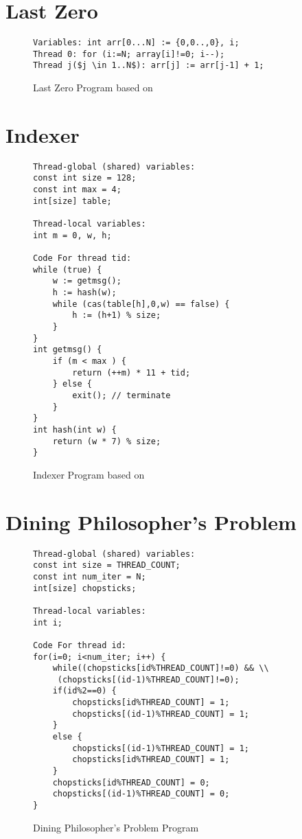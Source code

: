 \section{Last Zero}
\begin{figure}[h]
\begin{lstlisting}[mathescape=true,style=customc]
Variables: int arr[0...N] := {0,0..,0}, i;
Thread 0: for (i:=N; array[i]!=0; i--);
Thread j($j \in 1..N$): arr[j] := arr[j-1] + 1;
\end{lstlisting}
\caption{Last Zero Program based on \citet{abdulla2014optimal}}
\label{code_lastzero}
\end{figure}

\section{Indexer}
\begin{figure}[h]
\begin{lstlisting}[style=customc]
Thread-global (shared) variables:
const int size = 128;
const int max = 4;
int[size] table;

Thread-local variables:
int m = 0, w, h;

Code For thread tid:
while (true) {
	w := getmsg();
	h := hash(w);
	while (cas(table[h],0,w) == false) {
		h := (h+1) % size;
	}
}
int getmsg() {
	if (m < max ) {
		return (++m) * 11 + tid;
	} else {
		exit(); // terminate
	}
}
int hash(int w) {
	return (w * 7) % size;
}
\end{lstlisting}
\caption{Indexer Program based on \citet{dynamic_por}}
\label{code_indexer}
\end{figure}
\newpage
\section{Dining Philosopher's Problem}

\begin{figure}[h]
\begin{lstlisting}[style=customc]
Thread-global (shared) variables:
const int size = THREAD_COUNT;
const int num_iter = N;
int[size] chopsticks;

Thread-local variables:
int i;

Code For thread id:
for(i=0; i<num_iter; i++) {
	while((chopsticks[id%THREAD_COUNT]!=0) && \\
	 (chopsticks[(id-1)%THREAD_COUNT]!=0);
	if(id%2==0) {
		chopsticks[id%THREAD_COUNT] = 1;
		chopsticks[(id-1)%THREAD_COUNT] = 1;
	}
	else {
		chopsticks[(id-1)%THREAD_COUNT] = 1;
		chopsticks[id%THREAD_COUNT] = 1;
	}
	chopsticks[id%THREAD_COUNT] = 0;
	chopsticks[(id-1)%THREAD_COUNT] = 0;
}
\end{lstlisting}
\caption{Dining Philosopher's Problem Program}
\label{code_dining_phil}
\end{figure}